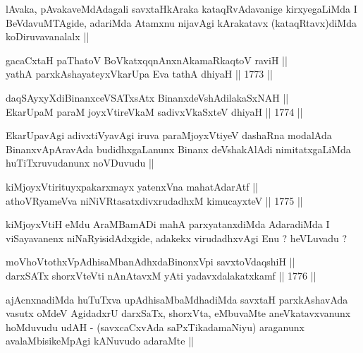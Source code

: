 \begin{artha}
lAvaka, pAvakaveMdAdagali savxtaHkAraka kataqRvAdavanige kirxyegaLiMda
I BeVdavuMTAgide, adariMda Atamxnu nijavAgi kArakatavx
(kataqRtavx)diMda koDiruvavanalalx ||
\end{artha}

\begin{shl}
gacaCxtaH paThatoV BoVkatxqqnAnxnAkamaRkaqtoV raviH || \\
yathA parxkAshayateyxVkarUpa Eva tathA dhiyaH ||  1773 ||  
\end{shl}




\begin{shl}
daqSAyxyXdiBinanxceVSATxsAtx BinanxdeVshAdilakaSxNAH || \\
EkarUpaM paraM joyxVtireVkaM sadivxVkaSxteV dhiyaH ||  1774 ||  
\end{shl}

\begin{artha}
EkarUpavAgi adivxtiVyavAgi iruva paraMjoyxVtiyeV dashaRna modalAda
BinanxvApAravAda budidhxgaLanunx Binanx deVshakAlAdi nimitatxgaLiMda
huTiTxruvudanunx noVDuvudu ||
\end{artha}

\begin{shl}
kiMjoyxVtirituyxpakarxmayx yatenxVna mahatA\s \s darAtf ||  \\
athoVR\s yameVva niNiVRtasatxdivxrudadhxM kimucayxteV ||  1775 ||  
\end{shl}

\begin{artha}
kiMjoyxVtiH eMdu AraMBamADi mahA parxyatanxdiMda AdaradiMda I
viSayavanenx niNaRyisidAdxgide, adakekx virudadhxvAgi Enu ? heVLuvadu ?
\end{artha}


\begin{shl}
moVhoVtothxVpAdhisaMbanAdhxdaBinonxV\s pi savxtoVdaqshiH || \\
darxSATx shorxVteVti nAnAtavxM yAti yadavxdalakatxkamf ||  1776 ||  
\end{shl}

\begin{artha}
ajAcnxnadiMda huTuTxva upAdhisaMbaMdhadiMda savxtaH parxkAshavAda
vasutx oMdeV AgidadxrU darxSaTx, shorxVta, eMbuvaMte aneVkatavxvanunx
hoMduvudu udAH - (savxcaCxvAda saPxTikadamaNiyu) araganunx
avalaMbisikeMpAgi kANuvudo adaraMte ||
\end{artha}


